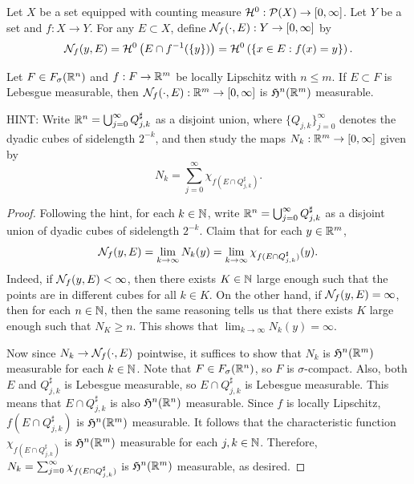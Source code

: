 \documentclass[a4paper]{article}
\begin{document}
\begin{defi}
Let $X$ be a set equipped with counting measure
$\mathcal{H}^0 : \mathcal{P}(X) \to [0, \infty]$. Let $Y$ be a set
and $f: X \to Y$. For any $E \subset X$, define
$\mathcal{N}_f (\cdot, E) : Y \to [0, \infty]$ by
\[
\mathcal{N}_f(y, E) = \mathcal{H}^0 \left( E \cap f^{-1} (\{y\}) \right)
= \mathcal{H}^0 \left( \left\{ x \in E: f(x) = y \right\} \right).
\]
\end{defi}

\begin{thm}
Let $F \in F_\sigma(\mathbb{R}^n)$ and $f: F \to \mathbb{R}^m$ be locally
Lipschitz with $n \leq m$. If $E \subset F$ is Lebesgue
measurable, then $\mathcal{N}_f(\cdot, E) : \mathbb{R}^m \to [0, \infty]$
is $\mathfrak{H}^n(\mathbb{R}^m)$ measurable.
\end{thm}

HINT: Write $\mathbb{R}^n = \bigcup_{j=0}^\infty 
Q_{j,k}^\sharp$ as a disjoint union, where 
$\{Q_{j,k}\}_{j=0}^\infty$ denotes the dyadic cubes of 
sidelength $2^{-k}$, and then study the maps $N_k : \mathbb{R}^m 
\to [0,\infty]$ given by 
\begin{equation*}
N_k = \sum_{j=0}^\infty \chi_{f(E \cap Q_{j,k}^\sharp)}.
\end{equation*}

\begin{proof}
Following the hint, for each $k \in \mathbb{N}$, write 
$\mathbb{R}^n = \bigcup_{j=0}^\infty Q_{j, k}^\sharp$
as a disjoint union of dyadic cubes of sidelength $2^{-k}$.
Claim that for each $y \in \mathbb{R}^m$, 
\[
\mathcal{N}_f (y, E) = \lim_{k \to \infty} N_k(y)
= \lim_{k \to \infty} \chi_{f(E \cap Q_{j, k}^\sharp)}(y).
\]
Indeed, if $\mathcal{N}_f(y, E) < \infty$, then there exists 
$K \in \mathbb{N}$ large enough such that the points are in 
different cubes for all $k \in K$. On the other hand, 
if $\mathcal{N}_f(y, E) = \infty$, then for each $n \in \mathbb{N}$, 
then the same reasoning tells us that 
there exists $K$ large enough such that $N_K \geq n$. 
This shows that $\lim_{k \to \infty} N_k(y) = \infty$.

Now since $N_k \to \mathcal{N}_f(\cdot, E)$ pointwise, it suffices 
to show that $N_k$ is $\mathfrak{H}^n(\mathbb{R}^m)$ measurable 
for each $k \in \mathbb{N}$. Note that $F \in F_\sigma(\mathbb{R}^n)$, so 
$F$ is $\sigma$-compact. Also, both $E$ 
and $Q_{j, k}^\sharp$ is Lebesgue measurable, so 
$E \cap Q_{j, k}^\sharp$ is Lebesgue measurable. 
This means that $E \cap Q_{j, k}^\sharp$ is also 
$\mathfrak{H}^n(\mathbb{R}^n)$ measurable. Since $f$ is locally Lipschitz, 
$f(E \cap Q_{j, k}^\sharp)$ is $\mathfrak{H}^n(\mathbb{R}^m)$ measurable. It
follows that the characteristic function 
$\chi_{f(E \cap Q_{j, k}^\sharp)}$ is $\mathfrak{H}^n 
(\mathbb{R}^m)$ measurable for each $j, k \in \mathbb{N}$. Therefore, 
$N_k = \sum_{j=0}^\infty \chi_{f(E \cap Q_{j, k}^\sharp)}$ is 
$\mathfrak{H}^n(\mathbb{R}^m)$ measurable, as desired.
\end{proof}
\end{document}
